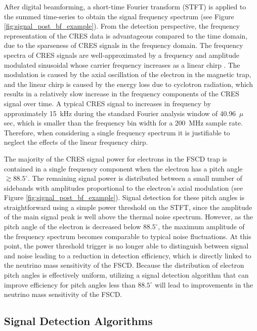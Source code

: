 After digital beamforming, a short-time Fourier transform (STFT) is applied to the summed time-series to obtain the signal frequency spectrum (see Figure \ref{fig:signal_post_bf_example}). From the detection perspective, the frequency representation of the CRES data is advantageous compared to the time domain, due to the sparseness of CRES signals in the frequency domain. The frequency spectra of CRES signals are well-approximated by a frequency and amplitude modulated sinusoidal whose carrier frequency increases as a linear chirp \cite{p8pheno}. The modulation is caused by the axial oscillation of the electron in the magnetic trap, and the linear chirp is caused by the energy loss due to cyclotron radiation, which results in a relatively slow increase in the frequency components of the CRES signal over time. A typical CRES signal to increases in frequency by approximately 15~kHz during the standard Fourier analysis window of 40.96~$\mu$sec, which is smaller than the frequency bin width for a 200~MHz sample rate. Therefore, when considering a single frequency spectrum it is justifiable to neglect the effects of the linear frequency chirp. 

The majority of the CRES signal power for electrons in the FSCD trap is contained in a single frequency component when the electron has a pitch angle $\gtrsim 88.5^\circ$. The remaining signal power is distributed between a small number of sidebands with amplitudes proportional to the electron's axial modulation (see Figure \ref{fig:signal_post_bf_example}). Signal detection for these pitch angles is straightforward using a simple power threshold on the STFT, since the amplitude of the main signal peak is well above the thermal noise spectrum. However, as the pitch angle of the electron is decreased below $88.5^\circ$, the maximum amplitude of the frequency spectrum becomes comparable to typical noise fluctuations. At this point, the power threshold trigger is no longer able to distinguish between signal and noise leading to a reduction in detection efficiency, which is directly linked to the neutrino mass sensitivity of the FSCD. Because the distribution of electron pitch angles is effectively uniform, utilizing a signal detection algorithm that can improve efficiency for pitch angles less than $88.5^\circ$ will lead to improvements in the neutrino mass sensitivity of the FSCD. 

\subsection{Signal Detection Algorithms}
\label{sec:classifiers}

